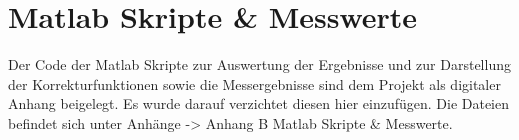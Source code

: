 \chapter{Matlab Skripte \& Messwerte}
\label{sec:appendixB}

Der Code der Matlab Skripte zur Auswertung der Ergebnisse und zur Darstellung der Korrekturfunktionen sowie die Messergebnisse sind dem Projekt als digitaler Anhang beigelegt. Es wurde darauf verzichtet diesen hier einzufügen. 
Die Dateien befindet sich unter Anhänge -> Anhang B Matlab Skripte \& Messwerte.